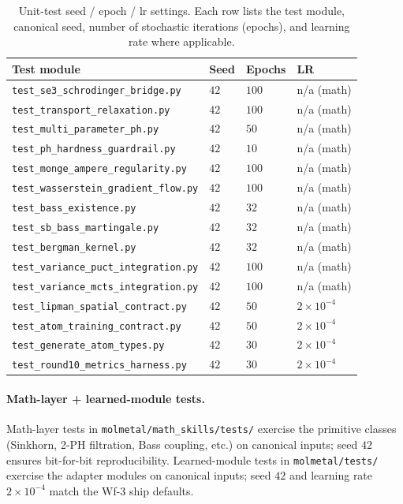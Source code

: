 \begin{table}[h]
  \centering
  \small
  \caption{Unit-test seed / epoch / lr settings.  Each row lists
  the test module, canonical seed, number of stochastic
  iterations (epochs), and learning rate where applicable.}
  \label{tab:test-seeds}
  \begin{tabular}{llll}
    \toprule
    \textbf{Test module} & \textbf{Seed} & \textbf{Epochs} &
    \textbf{LR} \\
    \midrule
    \texttt{test\_se3\_schrodinger\_bridge.py}
      & $42$ & $100$ & n/a (math) \\
    \texttt{test\_transport\_relaxation.py}
      & $42$ & $100$ & n/a (math) \\
    \texttt{test\_multi\_parameter\_ph.py}
      & $42$ & $50$ & n/a (math) \\
    \texttt{test\_ph\_hardness\_guardrail.py}
      & $42$ & $10$ & n/a (math) \\
    \texttt{test\_monge\_ampere\_regularity.py}
      & $42$ & $100$ & n/a (math) \\
    \texttt{test\_wasserstein\_gradient\_flow.py}
      & $42$ & $100$ & n/a (math) \\
    \texttt{test\_bass\_existence.py}
      & $42$ & $32$ & n/a (math) \\
    \texttt{test\_sb\_bass\_martingale.py}
      & $42$ & $32$ & n/a (math) \\
    \texttt{test\_bergman\_kernel.py}
      & $42$ & $32$ & n/a (math) \\
    \texttt{test\_variance\_puct\_integration.py}
      & $42$ & $100$ & n/a (math) \\
    \texttt{test\_variance\_mcts\_integration.py}
      & $42$ & $100$ & n/a (math) \\
    \texttt{test\_lipman\_spatial\_contract.py}
      & $42$ & $50$ & $2 \times 10^{-4}$ \\
    \texttt{test\_atom\_training\_contract.py}
      & $42$ & $50$ & $2 \times 10^{-4}$ \\
    \texttt{test\_generate\_atom\_types.py}
      & $42$ & $30$ & $2 \times 10^{-4}$ \\
    \texttt{test\_round10\_metrics\_harness.py}
      & $42$ & $30$ & $2 \times 10^{-4}$ \\
    \bottomrule
  \end{tabular}
\end{table}

\paragraph{Math-layer + learned-module tests.}
Math-layer tests in \texttt{molmetal/math\_skills/tests/} exercise
the primitive classes (Sinkhorn, 2-PH filtration, Bass coupling,
etc.) on canonical inputs; seed $42$ ensures bit-for-bit
reproducibility.  Learned-module tests in \texttt{molmetal/tests/}
exercise the adapter modules on canonical inputs; seed $42$ and
learning rate $2 \times 10^{-4}$ match the Wf-3 ship defaults.

